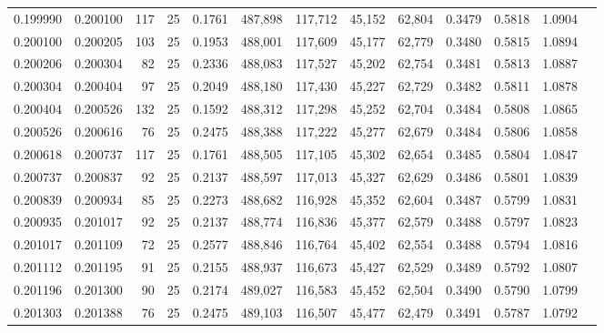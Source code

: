\begin{tabular}{rrrrrrrrrrrrr}
0.199990 & 0.200100 &   117 &  25 &                                     0.1761 & 487,898 & 117,712 &  45,152 &  62,804 & 0.3479 & 0.5818 & 1.0904 \\
0.200100 & 0.200205 &   103 &  25 &                                     0.1953 & 488,001 & 117,609 &  45,177 &  62,779 & 0.3480 & 0.5815 & 1.0894 \\
0.200206 & 0.200304 &    82 &  25 &                                     0.2336 & 488,083 & 117,527 &  45,202 &  62,754 & 0.3481 & 0.5813 & 1.0887 \\
0.200304 & 0.200404 &    97 &  25 &                                     0.2049 & 488,180 & 117,430 &  45,227 &  62,729 & 0.3482 & 0.5811 & 1.0878 \\
0.200404 & 0.200526 &   132 &  25 &                                     0.1592 & 488,312 & 117,298 &  45,252 &  62,704 & 0.3484 & 0.5808 & 1.0865 \\
0.200526 & 0.200616 &    76 &  25 &                                     0.2475 & 488,388 & 117,222 &  45,277 &  62,679 & 0.3484 & 0.5806 & 1.0858 \\
0.200618 & 0.200737 &   117 &  25 &                                     0.1761 & 488,505 & 117,105 &  45,302 &  62,654 & 0.3485 & 0.5804 & 1.0847 \\
0.200737 & 0.200837 &    92 &  25 &                                     0.2137 & 488,597 & 117,013 &  45,327 &  62,629 & 0.3486 & 0.5801 & 1.0839 \\
0.200839 & 0.200934 &    85 &  25 &                                     0.2273 & 488,682 & 116,928 &  45,352 &  62,604 & 0.3487 & 0.5799 & 1.0831 \\
0.200935 & 0.201017 &    92 &  25 &                                     0.2137 & 488,774 & 116,836 &  45,377 &  62,579 & 0.3488 & 0.5797 & 1.0823 \\
0.201017 & 0.201109 &    72 &  25 &                                     0.2577 & 488,846 & 116,764 &  45,402 &  62,554 & 0.3488 & 0.5794 & 1.0816 \\
0.201112 & 0.201195 &    91 &  25 &                                     0.2155 & 488,937 & 116,673 &  45,427 &  62,529 & 0.3489 & 0.5792 & 1.0807 \\
0.201196 & 0.201300 &    90 &  25 &                                     0.2174 & 489,027 & 116,583 &  45,452 &  62,504 & 0.3490 & 0.5790 & 1.0799 \\
0.201303 & 0.201388 &    76 &  25 &                                     0.2475 & 489,103 & 116,507 &  45,477 &  62,479 & 0.3491 & 0.5787 & 1.0792 \\

\end{tabular}
